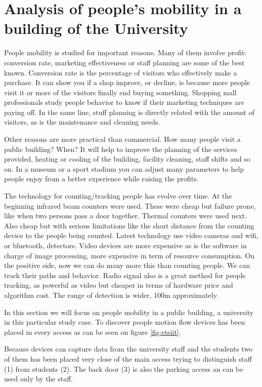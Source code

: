 \documentclass[preprint]{elsarticle}
\begin{document}
\section{Analysis of people's mobility in a building of the University}
\label{sec:etsiit}

People mobility is studied for important reasons. Many of them involve profit: conversion rate, marketing effectiveness or staff planning are some of the best known. Conversion rate is the percentage of visitors who effectively make a purchase. It can show you if a shop improve, or decline, is because more people visit it or more of the visitors finally end buying something. Shopping mall professionals study people behavior to know if their marketing techniques are paying off. In the same line, stuff planning is directly related with the amount of visitors, as is the maintenance and cleaning needs.

Other reasons are more practical than commercial. How many people visit a public building? When? It will help to improve the planning of the services provided, heating or cooling of the building, facility cleaning, staff shifts and so on. In a museum or a sport stadium you can adjust many parameters to help people enjoy from a better experience while raising the profits.

The technology for counting/tracking people has evolve over time. At the beginning infrared beam counters were used. These were cheap but failure prone, like when two persons pass a door together. Thermal counters were used next. Also cheap but with serious limitations like the short distance from the counting device to the people being counted. Latest technology use video cameras and wifi, or bluetooth, detectors. Video devices are more expensive as is the software in charge of image processing, more expensive in term of resource consumption. On the positive side, now we can do many more this than counting people. We can track their paths and behavior. Radio signal also is a great method for people tracking, as powerful as video but cheaper in terms of hardware price and algorithm cost. The range of detection is wider, 100m approximately.

In this section we will focus on people mobility in a public building, a university in this particular study case. To discover people motion flow devices has been placed in every access as can be seen on figure \ref{fig:etsiit}.

Because devices can capture data from the university staff and the students two of them has been placed very close of the main access trying to distinguish staff (1) from students (2). The back door (3) is also the parking access an can be used only by the staff.
\end{document}

